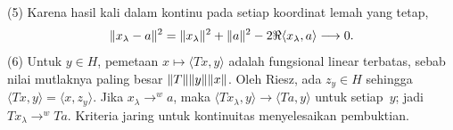 \begin{o001solution}
\begin{o001proof}
(5) Karena hasil kali dalam kontinu pada setiap koordinat lemah yang tetap,
\[
 \lVert x_\lambda-a\rVert^2
 =\lVert x_\lambda\rVert^2+\lVert a\rVert^2
  -2\Re\langle x_\lambda,a\rangle\longrightarrow0.
\]
(6) Untuk $y\in H$, pemetaan
$x\mapsto\langle Tx,y\rangle$ adalah fungsional linear terbatas, sebab nilai
mutlaknya paling besar $\lVert T\rVert\lVert y\rVert\lVert x\rVert$. Oleh Riesz, ada $z_y\in H$
sehingga $\langle Tx,y\rangle=\langle x,z_y\rangle$. Jika
$x_\lambda\to^w a$, maka
$\langle Tx_\lambda,y\rangle\to\langle Ta,y\rangle$ untuk setiap~$y$;
jadi $Tx_\lambda\to^wTa$. Kriteria jaring untuk kontinuitas menyelesaikan
pembuktian.
\end{o001proof}
\end{o001solution}

